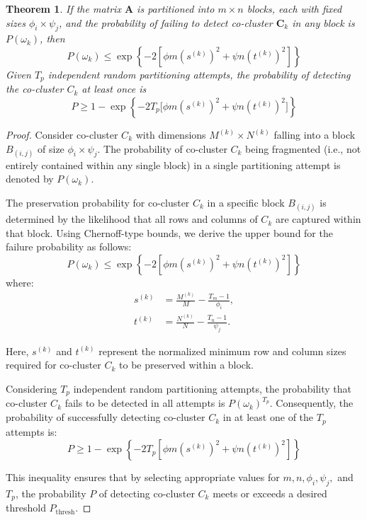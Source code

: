 \documentclass[journal]{IEEEtran}
\newtheorem{theorem}{Theorem}
\begin{document}
\begin{theorem}
    \label{thm:probability_co_cluster_detection_fixed}
    If the matrix $\mathbf{A}$ is partitioned into $m \times n$ blocks, each with fixed sizes $\phi_i \times \psi_j$, and the probability of failing to detect co-cluster $\mathbf{C}_k$ in any block is $P(\omega_k)$, then
    \begin{equation}
        P(\omega_k) \le \exp \left\{ -2 \left\lbrack \phi m \left(s^{(k)}\right)^2 + \psi n \left(t^{(k)}\right)^2 \right\rbrack \right\}
    \end{equation}
    Given $T_p$ independent random partitioning attempts, the probability of detecting the co-cluster $C_k$ at least once is
    \begin{equation}
        P \ge 1 - \exp \left\{ -2 T_p \lbrack \phi m (s^{(k)})^2 + \psi n (t^{(k)})^2\rbrack  \right\}
    \end{equation}
\end{theorem}

\begin{proof}
    Consider co-cluster $C_k$ with dimensions $M^{(k)} \times N^{(k)}$ falling into a block $B_{(i,j)}$ of size $\phi_i \times \psi_j$. The probability of co-cluster $C_k$ being fragmented (i.e., not entirely contained within any single block) in a single partitioning attempt is denoted by $P(\omega_k)$.

    The preservation probability for co-cluster $C_k$ in a specific block $B_{(i,j)}$ is determined by the likelihood that all rows and columns of $C_k$ are captured within that block. Using Chernoff-type bounds, we derive the upper bound for the failure probability as follows:
    \begin{equation}
        P(\omega_k) \le \exp \left\{ -2 \left\lbrack \phi m \left(s^{(k)}\right)^2 + \psi n \left(t^{(k)}\right)^2 \right\rbrack \right\}
    \end{equation}
    where:
    \begin{align*}
        s^{(k)} & = \frac{M^{(k)}}{M} - \frac{T_m - 1}{\phi_i}, \\
        t^{(k)} & = \frac{N^{(k)}}{N} - \frac{T_n - 1}{\psi_j}.
    \end{align*}

    Here, \(s^{(k)}\) and \(t^{(k)}\) represent the normalized minimum row and column sizes required for co-cluster \(C_k\) to be preserved within a block.

    Considering $T_p$ independent random partitioning attempts, the probability that co-cluster $C_k$ fails to be detected in all attempts is \( P(\omega_k)^{T_p} \). Consequently, the probability of successfully detecting co-cluster $C_k$ in at least one of the $T_p$ attempts is:
    \begin{equation}
        P \ge 1 - \exp \left\{ -2 T_p \left\lbrack \phi m \left(s^{(k)}\right)^2 + \psi n \left(t^{(k)}\right)^2 \right\rbrack \right\}
    \end{equation}

    This inequality ensures that by selecting appropriate values for \(m, n, \phi_i, \psi_j,\) and \(T_p\), the probability \(P\) of detecting co-cluster \(C_k\) meets or exceeds a desired threshold \(P_{\text{thresh}}\).
\end{proof}
\end{document}
